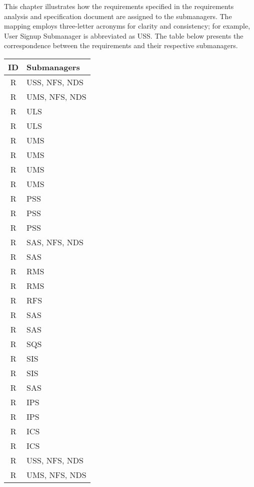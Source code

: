 This chapter illustrates how the requirements specified in the requirements analysis and specification document \cite{carraracurrodossi2024} are assigned to the submanagers.
The mapping employs three-letter acronyms for clarity and consistency; for example, User Signup Submanager is abbreviated as USS.
The table below presents the correspondence between the requirements and their respective submanagers.

\setcounter{r}{1}
\newcommand{\rc}{\ther\stepcounter{r}}
\renewcommand{\arraystretch}{1.5}
\begin{longtable}{|c|p{8.5cm}|}
    \hline \rowcolor{polimiblue!40}
    \textbf{ID} & \textbf{Submanagers} \\ \hline
    R\rc & USS, NFS, NDS \\ \hline
    R\rc & UMS, NFS, NDS \\ \hline
    R\rc & ULS \\ \hline
    R\rc & ULS \\ \hline
    R\rc & UMS \\ \hline
    R\rc & UMS \\ \hline
    R\rc & UMS \\ \hline
    R\rc & UMS \\ \hline
    R\rc & PSS \\ \hline
    R\rc & PSS \\ \hline
    R\rc & PSS \\ \hline
    R\rc & SAS, NFS, NDS \\ \hline
    R\rc & SAS \\ \hline
    R\rc & RMS \\ \hline
    R\rc & RMS \\ \hline
    R\rc & RFS \\ \hline
    R\rc & SAS \\ \hline
    R\rc & SAS \\ \hline
    R\rc & SQS \\ \hline
    R\rc & SIS \\ \hline
    R\rc & SIS \\ \hline
    R\rc & SAS \\ \hline
    R\rc & IPS \\ \hline
    R\rc & IPS \\ \hline
    R\rc & ICS \\ \hline
    R\rc & ICS \\ \hline
    R\rc & USS, NFS, NDS \\ \hline
    R\rc & UMS, NFS, NDS \\ \hline

\end{longtable}
